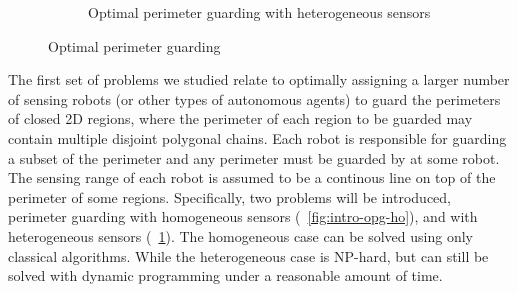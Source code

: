 \begin{figure}[h]
\begin{subfigure}[b]{0.4\textwidth}
        \caption{Optimal perimeter guarding with heterogeneous sensors}
        \label{fig:intro-opg-he}
    \end{subfigure}
    \caption{Optimal perimeter guarding}
    \label{fig:intro-opg}
\end{figure}


The first set of problems we studied relate to optimally assigning a larger number of sensing
robots (or other types of autonomous agents) to guard the perimeters of closed 2D regions,
where the perimeter of each region to be guarded may contain multiple disjoint polygonal chains.
Each robot is responsible for guarding a subset of the perimeter and any perimeter must be guarded
by at some robot.
The sensing range of each robot is assumed to be a continous line on top of the perimeter of some regions. 
Specifically, two problems will be introduced, perimeter guarding with homogeneous sensors (~\ref{fig:intro-opg-ho}),
and with heterogeneous sensors (~\ref{fig:intro-opg-he}). 
The homogeneous case can be solved using only classical algorithms. 
While the heterogeneous case is NP-hard, but can still be solved with dynamic programming under a reasonable
amount of time. 


